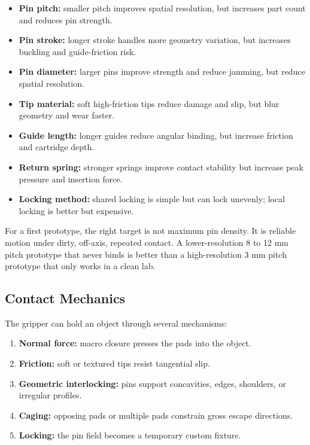 \documentclass[11pt]{article}
\begin{document}
\begin{itemize}[leftmargin=*]
  \item \textbf{Pin pitch:} smaller pitch improves spatial resolution, but increases part count and reduces pin strength.
  \item \textbf{Pin stroke:} longer stroke handles more geometry variation, but increases buckling and guide-friction risk.
  \item \textbf{Pin diameter:} larger pins improve strength and reduce jamming, but reduce spatial resolution.
  \item \textbf{Tip material:} soft high-friction tips reduce damage and slip, but blur geometry and wear faster.
  \item \textbf{Guide length:} longer guides reduce angular binding, but increase friction and cartridge depth.
  \item \textbf{Return spring:} stronger springs improve contact stability but increase peak pressure and insertion force.
  \item \textbf{Locking method:} shared locking is simple but can lock unevenly; local locking is better but expensive.
\end{itemize}

For a first prototype, the right target is not maximum pin density. It is reliable motion under dirty, off-axis, repeated contact. A lower-resolution 8 to 12 mm pitch prototype that never binds is better than a high-resolution 3 mm pitch prototype that only works in a clean lab.

\subsection{Contact Mechanics}

The gripper can hold an object through several mechanisms:

\begin{enumerate}[leftmargin=*]
  \item \textbf{Normal force:} macro closure presses the pads into the object.
  \item \textbf{Friction:} soft or textured tips resist tangential slip.
  \item \textbf{Geometric interlocking:} pins support concavities, edges, shoulders, or irregular profiles.
  \item \textbf{Caging:} opposing pads or multiple pads constrain gross escape directions.
  \item \textbf{Locking:} the pin field becomes a temporary custom fixture.
\end{enumerate}
\end{document}
